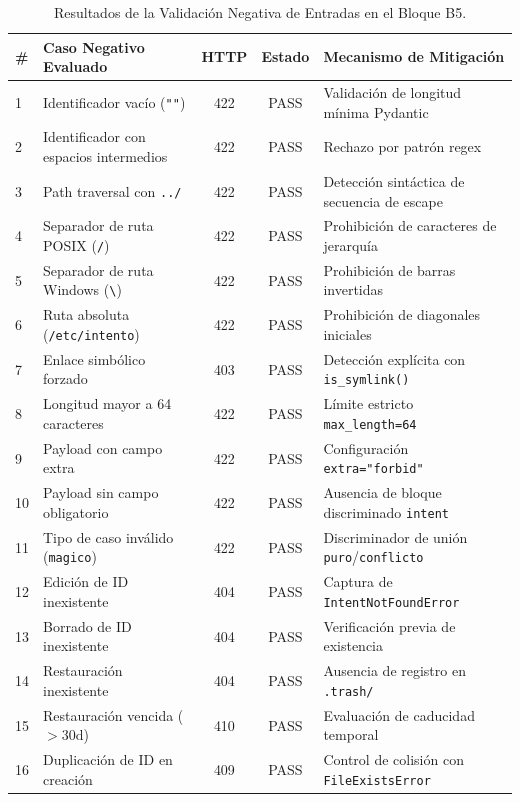 \documentclass[11pt,a4paper]{article}
\begin{document}
\begin{table}[H]
\centering
\small
\begin{tabularx}{\textwidth}{llccX}
\toprule
\textbf{\#} & \textbf{Caso Negativo Evaluado} & \textbf{HTTP} & \textbf{Estado} & \textbf{Mecanismo de Mitigación} \\
\midrule
1 & Identificador vacío (\texttt{""}) & 422 & PASS & Validación de longitud mínima Pydantic \\
2 & Identificador con espacios intermedios & 422 & PASS & Rechazo por patrón regex \\
3 & Path traversal con \texttt{../} & 422 & PASS & Detección sintáctica de secuencia de escape \\
4 & Separador de ruta POSIX (\texttt{/}) & 422 & PASS & Prohibición de caracteres de jerarquía \\
5 & Separador de ruta Windows (\texttt{\textbackslash}) & 422 & PASS & Prohibición de barras invertidas \\
6 & Ruta absoluta (\texttt{/etc/intento}) & 422 & PASS & Prohibición de diagonales iniciales \\
7 & Enlace simbólico forzado & 403 & PASS & Detección explícita con \texttt{is\_symlink()} \\
8 & Longitud mayor a 64 caracteres & 422 & PASS & Límite estricto \texttt{max\_length=64} \\
9 & Payload con campo extra & 422 & PASS & Configuración \texttt{extra="forbid"} \\
10 & Payload sin campo obligatorio & 422 & PASS & Ausencia de bloque discriminado \texttt{intent} \\
11 & Tipo de caso inválido (\texttt{magico}) & 422 & PASS & Discriminador de unión \texttt{puro}/\texttt{conflicto} \\
12 & Edición de ID inexistente & 404 & PASS & Captura de \texttt{IntentNotFoundError} \\
13 & Borrado de ID inexistente & 404 & PASS & Verificación previa de existencia \\
14 & Restauración inexistente & 404 & PASS & Ausencia de registro en \texttt{.trash/} \\
15 & Restauración vencida ($>30\text{d}$) & 410 & PASS & Evaluación de caducidad temporal \\
16 & Duplicación de ID en creación & 409 & PASS & Control de colisión con \texttt{FileExistsError} \\
\bottomrule
\end{tabularx}
\caption{Resultados de la Validación Negativa de Entradas en el Bloque B5.}
\label{tab:casos_negativos}
\end{table}
\end{document}
